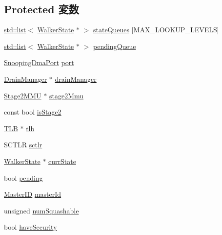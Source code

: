 \subsection*{Protected 変数}
\begin{DoxyCompactItemize}
\item 
\hyperlink{classstd_1_1list}{std::list}$<$ \hyperlink{classArmISA_1_1TableWalker_1_1WalkerState}{WalkerState} $\ast$ $>$ \hyperlink{classArmISA_1_1TableWalker_af819b2b862d892da5df10248b6d72787}{stateQueues} \mbox{[}MAX\_\-LOOKUP\_\-LEVELS\mbox{]}
\item 
\hyperlink{classstd_1_1list}{std::list}$<$ \hyperlink{classArmISA_1_1TableWalker_1_1WalkerState}{WalkerState} $\ast$ $>$ \hyperlink{classArmISA_1_1TableWalker_a53a70edbb255426f7f2729f482c7109b}{pendingQueue}
\item 
\hyperlink{classArmISA_1_1TableWalker_1_1SnoopingDmaPort}{SnoopingDmaPort} \hyperlink{classArmISA_1_1TableWalker_a9305ff92238d7360a5ee86168e00407b}{port}
\item 
\hyperlink{classDrainManager}{DrainManager} $\ast$ \hyperlink{classArmISA_1_1TableWalker_a329b71fb934a93312ca0aacbf5a3f982}{drainManager}
\item 
\hyperlink{classArmISA_1_1Stage2MMU}{Stage2MMU} $\ast$ \hyperlink{classArmISA_1_1TableWalker_a21ea64a0a6d9600fb09fff0854fd55d7}{stage2Mmu}
\item 
const bool \hyperlink{classArmISA_1_1TableWalker_a475f8007920fb01f7f8aa1730b3016bb}{isStage2}
\item 
\hyperlink{classArmISA_1_1TLB}{TLB} $\ast$ \hyperlink{classArmISA_1_1TableWalker_a9f0e11329a702fd34819769c899e4bd3}{tlb}
\item 
SCTLR \hyperlink{classArmISA_1_1TableWalker_a43c4d132ca97c6cc5358f7be3c2b5a69}{sctlr}
\item 
\hyperlink{classArmISA_1_1TableWalker_1_1WalkerState}{WalkerState} $\ast$ \hyperlink{classArmISA_1_1TableWalker_a5d1a85a0248e318a8191d54988c8782d}{currState}
\item 
bool \hyperlink{classArmISA_1_1TableWalker_a39f16d585c4531d2bf2562631a775d73}{pending}
\item 
\hyperlink{request_8hh_ac366b729262fd8e7cbd3283da6f775cf}{MasterID} \hyperlink{classArmISA_1_1TableWalker_a96ec6a422ac492d05f8b3edc5b58532b}{masterId}
\item 
unsigned \hyperlink{classArmISA_1_1TableWalker_acd34c708c5a97f4ce631bb3b00404045}{numSquashable}
\item 
bool \hyperlink{classArmISA_1_1TableWalker_a9f135583566fb70bba3c10395368f2e4}{haveSecurity}

\end{DoxyCompactItemize}
